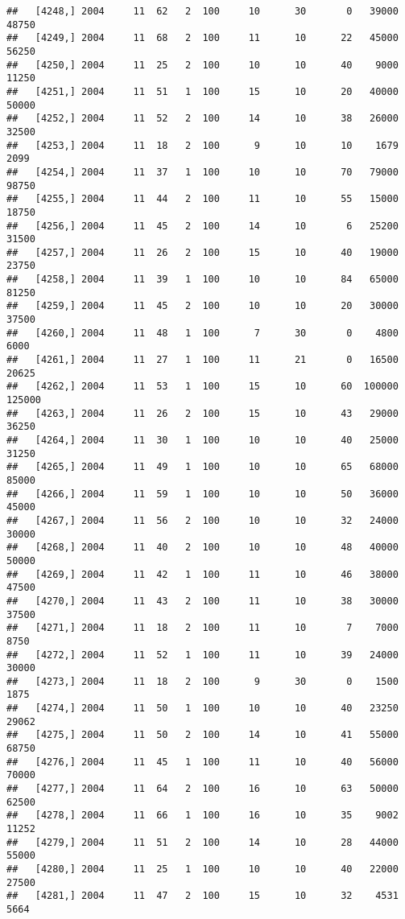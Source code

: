 \documentclass{article}\usepackage[]{graphicx}\usepackage[]{color}
\makeatletter
\newenvironment{kframe}{%
 \def\at@end@of@kframe{}%
 \ifinner\ifhmode%
  \def\at@end@of@kframe{\end{minipage}}%
  \begin{minipage}{\columnwidth}%
 \fi\fi%
 \def\FrameCommand##1{\hskip\@totalleftmargin \hskip-\fboxsep
 \colorbox{shadecolor}{##1}\hskip-\fboxsep
     \hskip-\linewidth \hskip-\@totalleftmargin \hskip\columnwidth}%
 \MakeFramed {\advance\hsize-\width
   \@totalleftmargin\z@ \linewidth\hsize
   \@setminipage}}%
 {\par\unskip\endMakeFramed%
 \at@end@of@kframe}
\newenvironment{knitrout}{}{} %
\makeatother
\begin{document}
\begin{knitrout}
\begin{kframe}
\begin{verbatim}
##   [4248,] 2004     11  62   2  100     10      30       0   39000   48750
##   [4249,] 2004     11  68   2  100     11      10      22   45000   56250
##   [4250,] 2004     11  25   2  100     10      10      40    9000   11250
##   [4251,] 2004     11  51   1  100     15      10      20   40000   50000
##   [4252,] 2004     11  52   2  100     14      10      38   26000   32500
##   [4253,] 2004     11  18   2  100      9      10      10    1679    2099
##   [4254,] 2004     11  37   1  100     10      10      70   79000   98750
##   [4255,] 2004     11  44   2  100     11      10      55   15000   18750
##   [4256,] 2004     11  45   2  100     14      10       6   25200   31500
##   [4257,] 2004     11  26   2  100     15      10      40   19000   23750
##   [4258,] 2004     11  39   1  100     10      10      84   65000   81250
##   [4259,] 2004     11  45   2  100     10      10      20   30000   37500
##   [4260,] 2004     11  48   1  100      7      30       0    4800    6000
##   [4261,] 2004     11  27   1  100     11      21       0   16500   20625
##   [4262,] 2004     11  53   1  100     15      10      60  100000  125000
##   [4263,] 2004     11  26   2  100     15      10      43   29000   36250
##   [4264,] 2004     11  30   1  100     10      10      40   25000   31250
##   [4265,] 2004     11  49   1  100     10      10      65   68000   85000
##   [4266,] 2004     11  59   1  100     10      10      50   36000   45000
##   [4267,] 2004     11  56   2  100     10      10      32   24000   30000
##   [4268,] 2004     11  40   2  100     10      10      48   40000   50000
##   [4269,] 2004     11  42   1  100     11      10      46   38000   47500
##   [4270,] 2004     11  43   2  100     11      10      38   30000   37500
##   [4271,] 2004     11  18   2  100     11      10       7    7000    8750
##   [4272,] 2004     11  52   1  100     11      10      39   24000   30000
##   [4273,] 2004     11  18   2  100      9      30       0    1500    1875
##   [4274,] 2004     11  50   1  100     10      10      40   23250   29062
##   [4275,] 2004     11  50   2  100     14      10      41   55000   68750
##   [4276,] 2004     11  45   1  100     11      10      40   56000   70000
##   [4277,] 2004     11  64   2  100     16      10      63   50000   62500
##   [4278,] 2004     11  66   1  100     16      10      35    9002   11252
##   [4279,] 2004     11  51   2  100     14      10      28   44000   55000
##   [4280,] 2004     11  25   1  100     10      10      40   22000   27500
##   [4281,] 2004     11  47   2  100     15      10      32    4531    5664

\end{verbatim}
\end{kframe}
\end{knitrout}
\end{document}
